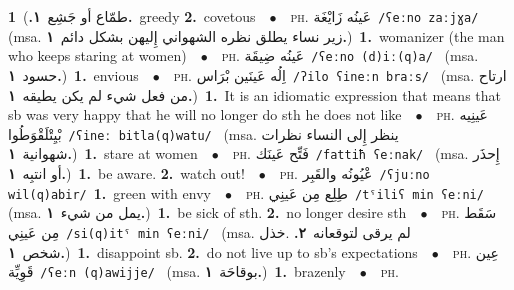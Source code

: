 \documentclass[10pt,a4paper,twoside]{article} %
\begin{document}
\begin{multicols}{2}
{{{{{{{{{{{{{{{{{{{{{{{{{{{{{{{{{{{{{{{{{{{{{{{{{{{{{{{{{{{{{{{{{{{{{{{{{{{{{{{{{{{{{{{{{{{{{{{{{{{{{{{{{{{{{{{{{{{{{{{{{{{{{{{{{{{{{{{{{{{{{{{{{{{{{{{{{{{{{{{{{{{{{\foreignlanguage{arabic}{طمّاع أو جَشِع}~\foreignlanguage{arabic}{\textbf{١.}})\color{black}\ \textbf{1.}~greedy  \textbf{2.}~covetous\ \ $\bullet$\ \ \textsc{ph.} \color{gray} \foreignlanguage{arabic}{عَينُه زَايْغَة}\color{black}\ {\color{gray}\texttt{/{\sffamily ʕeːno zaːjɣa}/}\color{black}}\ \color{gray} (msa. \foreignlanguage{arabic}{زير نساء يطلق نظره الشهواني إِليهن بشكل دائم}~\foreignlanguage{arabic}{\textbf{١.}})\color{black}\ \textbf{1.}~womanizer (the man who keeps staring at women)\ \ $\bullet$\ \ \textsc{ph.} \color{gray} \foreignlanguage{arabic}{عَينُه ضِيقَة}\color{black}\ {\color{gray}\texttt{/{\sffamily ʕeːno (d)iː(q)a}/}\color{black}}\ \color{gray} (msa. \foreignlanguage{arabic}{حسود}~\foreignlanguage{arabic}{\textbf{١.}})\color{black}\ \textbf{1.}~envious\ \ $\bullet$\ \ \textsc{ph.} \color{gray} \foreignlanguage{arabic}{اِلُه عَينَين بْرَاس}\color{black}\ {\color{gray}\texttt{/{\sffamily ʔilo ʕineːn braːs}/}\color{black}}\ \color{gray} (msa. \foreignlanguage{arabic}{ارتاح من فعل شيء لم يكن يطيقه}~\foreignlanguage{arabic}{\textbf{١.}})\color{black}\ \textbf{1.}~It is an idiomatic expression that means that sb was very happy that he will no longer do sth he does not like\ \ $\bullet$\ \ \textsc{ph.} \color{gray} \foreignlanguage{arabic}{عَينِيه بْيِتْلَقْوَطُوا}\color{black}\ {\color{gray}\texttt{/{\sffamily ʕineː bitla(q)watu}/}\color{black}}\ \color{gray} (msa. \foreignlanguage{arabic}{ينظر إِلى النساء نظرات شهوانية}~\foreignlanguage{arabic}{\textbf{١.}})\color{black}\ \textbf{1.}~stare at women\ \ $\bullet$\ \ \textsc{ph.} \color{gray} \foreignlanguage{arabic}{فَتِّح عَينَك}\color{black}\ {\color{gray}\texttt{/{\sffamily fattiħ ʕeːnak}/}\color{black}}\ \color{gray} (msa. \foreignlanguage{arabic}{إِحذَر أو انتبِه}~\foreignlanguage{arabic}{\textbf{١.}})\color{black}\ \textbf{1.}~be aware.  \textbf{2.}~watch out!\ \ $\bullet$\ \ \textsc{ph.} \color{gray} \foreignlanguage{arabic}{عْيُونُه والقَبِر}\color{black}\ {\color{gray}\texttt{/{\sffamily ʕjuːno wil(q)abir}/}\color{black}}\ \textbf{1.}~green with envy\ \ $\bullet$\ \ \textsc{ph.} \color{gray} \foreignlanguage{arabic}{طِلِع مِن عَينِي}\color{black}\ {\color{gray}\texttt{/{\sffamily tˤiliʕ min ʕeːni}/}\color{black}}\ \color{gray} (msa. \foreignlanguage{arabic}{يمل من شيء}~\foreignlanguage{arabic}{\textbf{١.}})\color{black}\ \textbf{1.}~be sick of sth.  \textbf{2.}~no longer desire sth\ \ $\bullet$\ \ \textsc{ph.} \color{gray} \foreignlanguage{arabic}{سَقَط مِن عَينِي}\color{black}\ {\color{gray}\texttt{/{\sffamily si(q)itˤ min ʕeːni}/}\color{black}}\ \color{gray} (msa. \foreignlanguage{arabic}{لم يرقى لتوقعانه}~\foreignlanguage{arabic}{\textbf{٢.}}  .\foreignlanguage{arabic}{خذل شخص}~\foreignlanguage{arabic}{\textbf{١.}})\color{black}\ \textbf{1.}~disappoint sb.  \textbf{2.}~do not live up to sb's expectations\ \ $\bullet$\ \ \textsc{ph.} \color{gray} \foreignlanguage{arabic}{عِين قَوِيِّة}\color{black}\ {\color{gray}\texttt{/{\sffamily ʕeːn (q)awijje}/}\color{black}}\ \color{gray} (msa. \foreignlanguage{arabic}{بوقاحَة}~\foreignlanguage{arabic}{\textbf{١.}})\color{black}\ \textbf{1.}~brazenly\ \ $\bullet$\ \ \textsc{ph.} }}}}}}}}}}}}}}}}}}}}}}}}}}}}}}}}}}}}}}}}}}}}}}}}}}}}}}}}}}}}}}}}}}}}}}}}}}}}}}}}}}}}}}}}}}}}}}}}}}}}}}}}}}}}}}}}}}}}}}}}}}}}}}}}}}}}}}}}}}}}}}}}}}}}}}}}}}}}}}}}}}}}}
\end{multicols}
\end{document}
